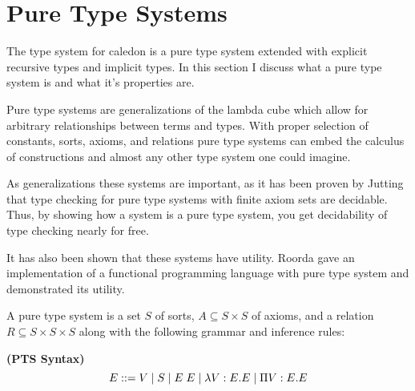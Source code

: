 \section{Pure Type Systems}

The type system for caledon is a pure type system \citep{mckinna1993pure} 
extended with explicit recursive types and implicit types.  In this section
I discuss what a pure type system is and what it's properties are.

Pure type systems are generalizations of the lambda cube
\citep{barendregt1991introduction} which allow for arbitrary 
relationships between terms and types.
With proper selection of constants, sorts, axioms, and relations
pure type systems can embed the calculus of constructions \citep{coquand1986calculus}
and almost any other type system one could imagine.

As generalizations these systems are important, as it has been proven by Jutting \citep{jutting1993typing} that 
type checking for pure type systems with finite axiom sets are decidable.  Thus, by showing how a system is a pure type system, 
you get decidability of type checking nearly for free.

It has also been shown that these systems have utility.  
Roorda \citep{roorda2001pure} gave an implementation of a functional programming language with 
pure type system and demonstrated its utility.

A pure type system is a set $S$ of sorts, 
$A\subseteq S \times S$ of axioms, and a relation 
$R \subseteq S \times S \times S$ along with the following grammar and inference rules:

\begin{definition}
\textbf{(PTS Syntax)}
\[ 
E ::=  V 
 \; | \; S 
 \; | \; E\;E 
 \; | \; \lambda V : E . E 
 \; | \; \Pi V : E . E 
\]

\label{pt:syntax}
\end{definition}

